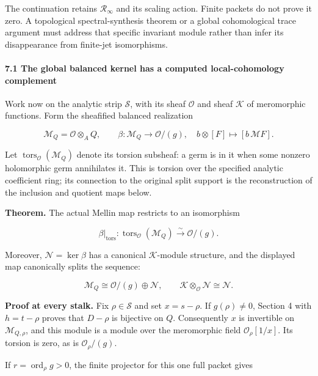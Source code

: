 The continuation retains \(\mathcal R_\infty\) and its scaling action. Finite packets do not prove
it zero. A topological spectral-synthesis theorem or a global cohomological trace argument must
address that specific invariant module rather than infer its disappearance from finite-jet
isomorphisms.

\paragraph{7.1 The global balanced kernel has a computed local-cohomology
complement}\label{pr_8:the-global-balanced-kernel-has-a-computed-local-cohomology-complement}

Work now on the analytic strip \(\mathscr S\), with its sheaf \(\mathcal O\) and sheaf
\(\mathcal K\) of meromorphic functions. Form the sheafified balanced realization

\[\mathcal M_Q=\mathcal O\otimes_AQ,\qquad
\beta:\mathcal M_Q\longrightarrow\mathcal O/(g),\quad
b\otimes[F]\longmapsto[b\,\mathcal MF].\]

Let \(\operatorname{tors}_{\mathcal O}(\mathcal M_Q)\) denote its torsion subsheaf: a germ is in it
when some nonzero holomorphic germ annihilates it. This is torsion over the specified analytic
coefficient ring; its connection to the original split support is the reconstruction of the
inclusion and quotient maps below.

\textbf{Theorem.} The actual Mellin map restricts to an isomorphism

\[\boxed{\beta|_{\operatorname{tors}}:
\operatorname{tors}_{\mathcal O}(\mathcal M_Q)
\xrightarrow{\sim}\mathcal O/(g).}\]

Moreover, \(\mathcal N=\ker\beta\) has a canonical \(\mathcal K\)-module structure, and the
displayed map canonically splits the sequence:

\[\boxed{\mathcal M_Q\cong\mathcal O/(g)\oplus\mathcal N,
\qquad\mathcal K\otimes_{\mathcal O}\mathcal N\cong\mathcal N.}\]

\textbf{Proof at every stalk.} Fix \(\rho\in\mathscr S\) and set \(x=s-\rho\). If \(g(\rho)\ne0\),
Section 4 with \(h=t-\rho\) proves that \(D-\rho\) is bijective on \(Q\). Consequently \(x\) is
invertible on \(\mathcal M_{Q,\rho}\), and this module is a module over the meromorphic field
\(\mathcal O_\rho[1/x]\). Its torsion is zero, as is \(\mathcal O_\rho/(g)\).

If \(r=\operatorname{ord}_\rho g>0\), the finite projector for this one full packet gives

